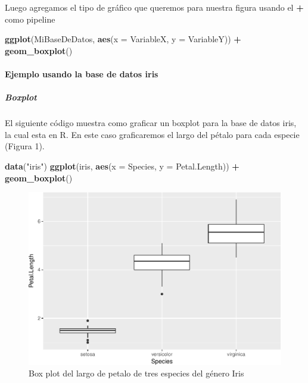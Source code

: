 \documentclass[]{article}
\newenvironment{Shaded}{\begin{snugshade}}{\end{snugshade}}
\newcommand{\KeywordTok}[1]{\textcolor[rgb]{0.13,0.29,0.53}{\textbf{#1}}}
\newcommand{\DataTypeTok}[1]{\textcolor[rgb]{0.13,0.29,0.53}{#1}}
\newcommand{\StringTok}[1]{\textcolor[rgb]{0.31,0.60,0.02}{#1}}
\newcommand{\OperatorTok}[1]{\textcolor[rgb]{0.81,0.36,0.00}{\textbf{#1}}}
\newcommand{\NormalTok}[1]{#1}
\let\oldparagraph\paragraph
\renewcommand{\paragraph}[1]{\oldparagraph{#1}\mbox{}}
\let\oldsubparagraph\subparagraph
\renewcommand{\subparagraph}[1]{\oldsubparagraph{#1}\mbox{}}
\begin{document}
Luego agregamos el tipo de gráfico que queremos para nuestra figura
usando el \textbf{+} como pipeline

\begin{Shaded}
\begin{Highlighting}[]
\KeywordTok{ggplot}\NormalTok{(MiBaseDeDatos, }\KeywordTok{aes}\NormalTok{(}\DataTypeTok{x =}\NormalTok{ VariableX, }\DataTypeTok{y =}\NormalTok{ VariableY)) }\OperatorTok{+}\StringTok{ }\KeywordTok{geom_boxplot}\NormalTok{()}
\end{Highlighting}
\end{Shaded}

\paragraph{Ejemplo usando la base de datos
iris}\label{ejemplo-usando-la-base-de-datos-iris}

\subparagraph{Boxplot}\label{boxplot}

El siguiente código muestra como graficar un boxplot para la base de
datos iris, la cual esta en R. En este caso graficaremos el largo del
pétalo para cada especie (Figura 1).

\begin{Shaded}
\begin{Highlighting}[]
\KeywordTok{data}\NormalTok{(}\StringTok{"iris"}\NormalTok{)}
\KeywordTok{ggplot}\NormalTok{(iris, }\KeywordTok{aes}\NormalTok{(}\DataTypeTok{x =}\NormalTok{ Species, }\DataTypeTok{y =}\NormalTok{ Petal.Length)) }\OperatorTok{+}\StringTok{ }\KeywordTok{geom_boxplot}\NormalTok{()}
\end{Highlighting}
\end{Shaded}

\begin{figure}
\centering
\includegraphics{Guia2_files/figure-latex/unnamed-chunk-5-1.pdf}
\caption{Box plot del largo de petalo de tres especies del género Iris}
\end{figure}
\end{document}
